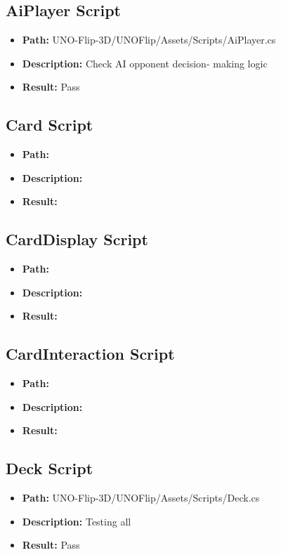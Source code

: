 \documentclass[12pt, titlepage]{article}
\begin{document}
\subsection{AiPlayer Script}
\begin{itemize}
    \item \textbf{Path:} UNO-Flip-3D/UNOFlip/Assets/Scripts/AiPlayer.cs
    \item \textbf{Description:} Check AI opponent decision-
making logic
    \item \textbf{Result:} Pass
\end{itemize}

\subsection{Card Script}
\begin{itemize}
    \item \textbf{Path:} 
    \item \textbf{Description:} 
    \item \textbf{Result:}
\end{itemize}

\subsection{CardDisplay Script}
\begin{itemize}
    \item \textbf{Path:} 
    \item \textbf{Description:} 
    \item \textbf{Result:}
\end{itemize}

\subsection{CardInteraction Script}
\begin{itemize}
    \item \textbf{Path:} 
    \item \textbf{Description:} 
    \item \textbf{Result:}
\end{itemize}

\subsection{Deck Script}
\begin{itemize}
    \item \textbf{Path:} UNO-Flip-3D/UNOFlip/Assets/Scripts/Deck.cs
    \item \textbf{Description:} Testing all 
    \item \textbf{Result:} Pass
\end{itemize}
\end{document}
